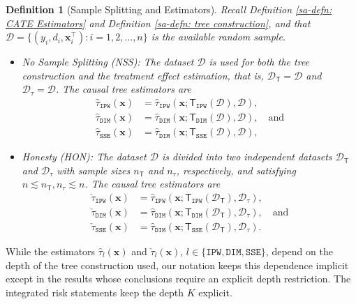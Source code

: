 \documentclass[10pt]{article}
\def\treeT{\mathsf{T}}
\def\bx{\mathbf{x}}
\newtheorem{definition}{Definition}
\theoremstyle{definition}
\theoremstyle{remark}
\begin{document}
\begin{definition}[Sample Splitting and Estimators]\label{sa-defn: data splitting}
    Recall Definition \ref{sa-defn: CATE Estimators} and Definition \ref{sa-defn: tree construction}, and that $\mathcal{D} = \{(y_i, d_i, \bx^\top_i):i=1,2,\dots,n\}$ is the available random sample.
    \begin{itemize}
        \item \textit{No Sample Splitting} (NSS): The dataset $\mathcal{D}$ is used for both the tree construction and the treatment effect estimation, that is, $\mathcal{D}_{\treeT} = \mathcal{D}$ and $\mathcal{D}_{\tau} = \mathcal{D}$. The causal tree estimators are
        \begin{align*}
            \hat\tau_{\mathtt{IPW}}(\bx)
            &= \hat\tau_{\mathtt{IPW}}(\bx; \treeT_{\mathtt{IPW}}(\mathcal{D}),\mathcal{D}),\\
            \hat\tau_{\mathtt{DIM}}(\bx)
            &= \hat\tau_{\mathtt{DIM}}(\bx; \treeT_{\mathtt{DIM}}(\mathcal{D}),\mathcal{D}), \quad \text{and}\\
            \hat\tau_{\mathtt{SSE}}(\bx)
            &= \hat\tau_{\mathtt{DIM}}(\bx; \treeT_{\mathtt{SSE}}(\mathcal{D}),\mathcal{D}),
        \end{align*}
    
        \item \textit{Honesty} (HON): The dataset $\mathcal{D}$ is divided into two independent datasets $\mathcal{D}_{\treeT}$ and $\mathcal{D}_{\tau}$ with sample sizes $n_{\treeT}$ and $n_\tau$, respectively, and satisfying $n \lesssim n_{\treeT}, n_{\tau} \lesssim n$. The causal tree estimators are
        \begin{align*}
            \check\tau_{\mathtt{IPW}}(\bx)
            &= \hat\tau_{\mathtt{IPW}}(\bx; \treeT_{\mathtt{IPW}}(\mathcal{D}_{\treeT}),\mathcal{D}_\tau),\\
            \check\tau_{\mathtt{DIM}}(\bx)
            &= \hat\tau_{\mathtt{DIM}}(\bx; \treeT_{\mathtt{DIM}}(\mathcal{D}_{\treeT}),\mathcal{D}_\tau), \quad \text{and}\\
            \check\tau_{\mathtt{SSE}}(\bx)
            &= \hat\tau_{\mathtt{DIM}}(\bx; \treeT_{\mathtt{SSE}}(\mathcal{D}_{\treeT}),\mathcal{D}_\tau).
        \end{align*}
    \end{itemize}
\end{definition}

While the estimators $\hat\tau_{l}(\bx)$ and $\check\tau_{l}(\bx)$, $l\in\{\mathtt{IPW},\mathtt{DIM},\mathtt{SSE}\}$, depend on the depth of the tree construction used, our notation keeps this dependence implicit except in the results whose conclusions require an explicit depth restriction. The integrated risk statements keep the depth $K$ explicit.
\end{document}
